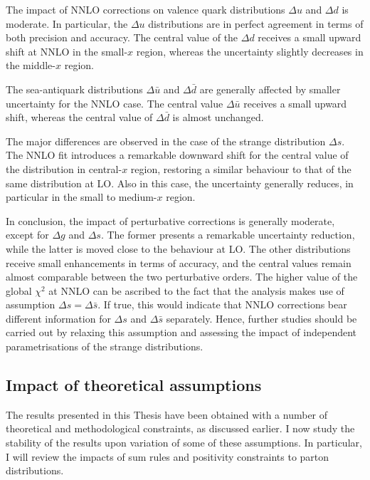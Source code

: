 The impact of NNLO corrections on valence quark distributions $\Delta u$ and $\Delta d$ is moderate. In particular, the $\Delta u$ distributions are in perfect agreement in terms of both precision and accuracy. The central value of the $\Delta d$ receives a small upward shift at NNLO in the small-$x$ region, whereas the uncertainty slightly decreases in the middle-$x$ region.%

The sea-antiquark distributions $\Delta \bar{u}$ and $\Delta \bar{d}$ are generally affected by smaller uncertainty for the NNLO case. The central value $\Delta \bar{u}$ receives a small upward shift, whereas the central value of $\Delta \bar{d}$ is almost unchanged.%

The major differences are observed in the case of the strange distribution $\Delta s$. The NNLO fit introduces a remarkable downward shift for the central value of the distribution in central-$x$ region, restoring a similar behaviour to that of the same distribution at LO. Also in this case, the uncertainty generally reduces, in particular in the small to medium-$x$ region.%

In conclusion, the impact of perturbative corrections is generally moderate, except for $\Delta g$ and $\Delta s$. The former presents a remarkable uncertainty reduction, while the latter is moved close to the behaviour at LO. The other distributions receive small enhancements in terms of accuracy, and the central values remain almost comparable between the two perturbative orders. The higher value of the global $\chi^2$ at NNLO can be ascribed to the fact that the analysis makes use of assumption $\Delta s = \Delta \bar{s}$. If true, this would indicate that NNLO corrections bear different information for $\Delta s$ and $\Delta \bar{s}$ separately. Hence, further studies should be carried out by relaxing this assumption and assessing the impact of independent parametrisations of the strange distributions.

\subsection{Impact of theoretical assumptions}
The results presented in this Thesis have been obtained with a number of theoretical and methodological constraints, as discussed earlier. I now study the stability of the results upon variation of some of these assumptions. In particular, I will review the impacts of sum rules and positivity constraints to parton distributions. 

